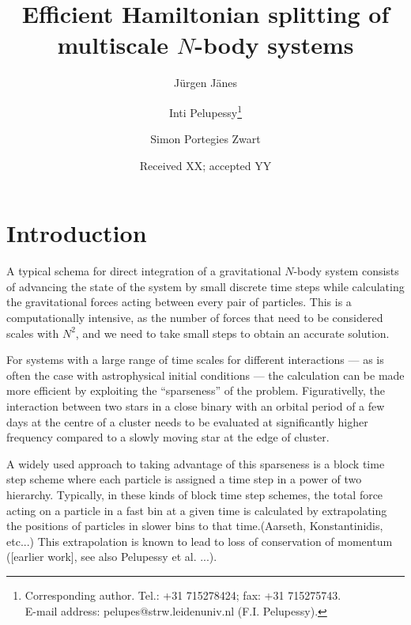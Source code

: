 \documentclass[referee]{aa}
\begin{document}
\title{Efficient Hamiltonian splitting of multiscale $N$-body systems}

\author{
J\"urgen J\"anes\and
Inti Pelupessy\thanks{
Corresponding author. Tel.: +31 715278424; fax: +31 715275743.\\
E-mail address: pelupes@strw.leidenuniv.nl (F.I. Pelupessy).}\and
Simon Portegies Zwart
}


\date{Received XX; accepted YY}


\maketitle

\section{Introduction}
A typical schema for direct integration of a gravitational $N$-body
system consists of advancing the state of the system by small discrete
time steps while calculating the gravitational forces
acting between every pair of particles. This is a computationally
intensive, as the number of forces that need to be considered scales
with $N^{2}$, and we need to take small steps to obtain an accurate
solution.

For systems with a large range of time scales for different interactions
--- as is often the case with astrophysical initial conditions ---
the calculation can be made more efficient by exploiting the ``sparseness''
of the problem. Figurativelly, the interaction between two stars in
a close binary with an orbital period of a few days at the centre
of a cluster needs to be evaluated at significantly higher frequency
compared to a slowly moving star at the edge of cluster.

A widely used approach to taking advantage of this sparseness is a block 
time step scheme where each particle is assigned a time step in a power 
of two hierarchy. Typically, in these kinds of block time step schemes, 
the total force acting on a particle in a fast bin at a given time is 
calculated by extrapolating the positions of particles in slower bins to 
that time.(Aarseth, Konstantinidis, etc...) This extrapolation is known 
to lead to loss of conservation of momentum ([earlier work], see also 
Pelupessy et al. ...).
\end{document}
